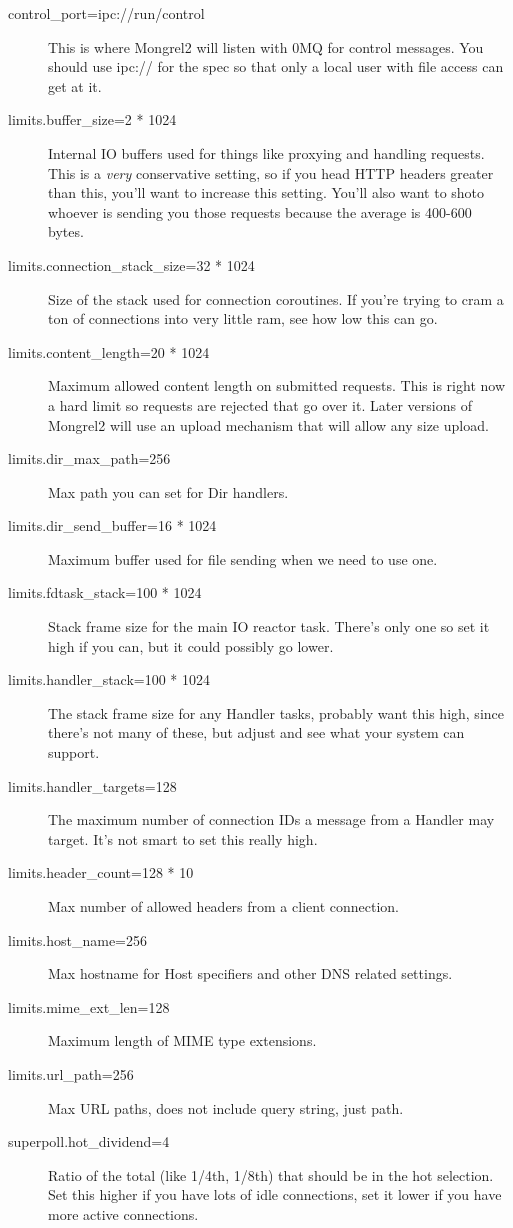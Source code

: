 \begin{description}
\item[control\_port=ipc://run/control] This is where Mongrel2 will listen with 0MQ for control messages.  You should use ipc:// for the spec so that only a local user with file access can get at it.
\item[limits.buffer\_size=2 * 1024] Internal IO buffers used for things like proxying and handling requests.  This is a \emph{very} conservative setting, so if you head HTTP headers greater than this, you'll want to increase this setting.  You'll also want to shoto whoever is sending you those requests because the average is 400-600 bytes.
\item[limits.connection\_stack\_size=32 * 1024] Size of the stack used for connection coroutines.  If you're trying to cram a ton of connections into very little ram, see how low this can go.
\item[limits.content\_length=20 * 1024] Maximum allowed content length on submitted requests.  This is right now a hard limit so requests are rejected that go over it.  Later versions of Mongrel2 will use an upload mechanism that will allow any size upload.
\item[limits.dir\_max\_path=256] Max path you can set for Dir handlers.
\item[limits.dir\_send\_buffer=16 * 1024] Maximum buffer used for file sending when we need to use one.
\item[limits.fdtask\_stack=100 * 1024] Stack frame size for the main IO reactor task.  There's only one so set it high if you can, but it could possibly go lower.
\item[limits.handler\_stack=100 * 1024] The stack frame size for any Handler tasks, probably want this high, since there's not many of these, but adjust and see what your system can support.
\item[limits.handler\_targets=128] The maximum number of connection IDs a message from a Handler may target.  It's not smart to set this really high.
\item[limits.header\_count=128 * 10] Max number of allowed headers from a client connection.
\item[limits.host\_name=256] Max hostname for Host specifiers and other DNS related settings.
\item[limits.mime\_ext\_len=128] Maximum length of MIME type extensions.
\item[limits.url\_path=256] Max URL paths, does not include query string, just path.
\item[superpoll.hot\_dividend=4] Ratio of the total (like 1/4th, 1/8th) that should be in the hot selection.  Set this higher if you have lots of idle connections, set it lower if you have more active connections.

\end{description}
